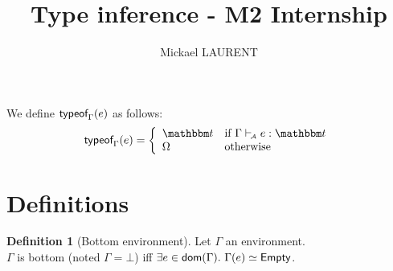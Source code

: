 \documentclass[a4paper]{article}
\title{\vspace{1.5cm}Type inference - M2 Internship}
\author{Mickael LAURENT}
\date{\vspace{-5ex}}
\theoremstyle{definition}
\newtheorem{definition}{Definition}
\begin{document}
  \maketitle

  We define $\textsf{typeof}_{\Gamma}(e)$ as follows:
  \begin{align*}
    \tyof e \Gamma = 
    \left\{\begin{array}{ll}
      \ts & \text{if } \Gamma \vdashA e:\ts \\
      \tsempty & \text{otherwise}
    \end{array}\right.
  \end{align*}

  \section{Definitions}

    \begin{definition}[Bottom environment]
      Let $\Gamma$ an environment.\\
      $\Gamma$ is bottom (noted $\Gamma = \bot$) iff $\exists e\in\dom\Gamma.\ \Gamma(e)\simeq\Empty$.
    \end{definition}
\end{document}
